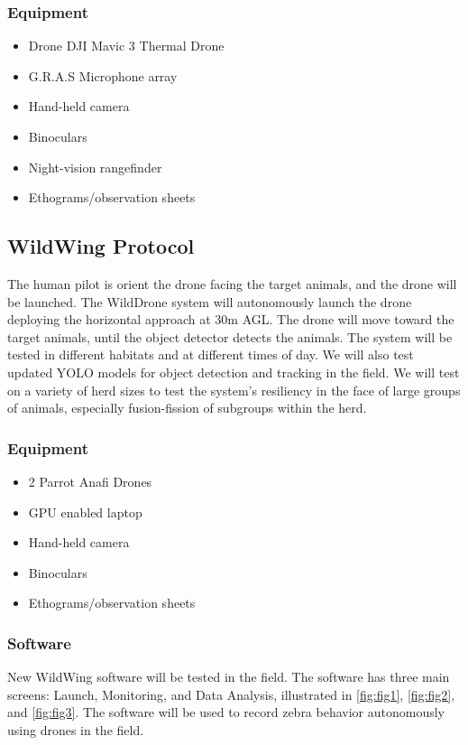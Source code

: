 \documentclass[final,5p,times,twocolumn]{elsarticle}
\begin{document}
\subsubsection{Equipment}
\begin{itemize}
    \item Drone DJI Mavic 3 Thermal Drone
    \item G.R.A.S Microphone array
    \item Hand-held camera
    \item Binoculars
    \item Night-vision rangefinder
    \item Ethograms/observation sheets
\end{itemize}


\subsection{WildWing Protocol}
The human pilot is orient the drone facing the target animals, and the drone will be launched.
The WildDrone system will autonomously launch the drone deploying the horizontal approach at 30m AGL.
The drone will move toward the target animals, until the object detector detects the animals.
The system will be tested in different habitats and at different times of day.
We will also test updated YOLO models for object detection and tracking in the field.
We will test on a variety of herd sizes to test the system's resiliency in the face of large groups of animals,
especially fusion-fission of subgroups within the herd.

\subsubsection{Equipment}
\begin{itemize}
    \item 2 Parrot Anafi Drones
    \item GPU enabled laptop
    \item Hand-held camera
    \item Binoculars
    \item Ethograms/observation sheets
\end{itemize}

\subsubsection{Software}
New WildWing software will be tested in the field. The software has three main screens: 
Launch, Monitoring, and Data Analysis, illustrated in 
\cref{fig:fig1}, \cref{fig:fig2}, and \cref{fig:fig3}.
The software will be used to record zebra behavior autonomously using drones in the field.
\end{document}
